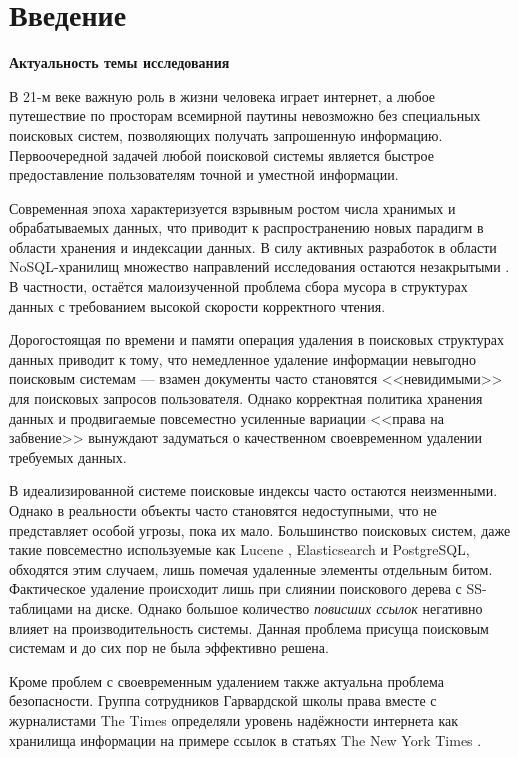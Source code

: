 \newpage
\section{Введение}

\textbf{Актуальность темы исследования}

В 21-м веке важную роль в жизни человека играет интернет, а любое путешествие
по просторам всемирной паутины невозможно без специальных поисковых систем,
позволяющих получать запрошенную информацию. Первоочередной задачей
любой поисковой системы является быстрое предоставление пользователям
точной и уместной информации.

Современная эпоха характеризуется взрывным ростом числа хранимых и обрабатываемых
данных, что приводит к распространению новых парадигм в области хранения и
индексации данных. В силу активных разработок в области NoSQL-хранилищ множество
направлений исследования остаются незакрытыми \cite{No-SQL:IoT}.
В частности, остаётся малоизученной проблема сбора мусора в структурах данных
с требованием высокой скорости корректного чтения.

Дорогостоящая по времени и памяти операция удаления в поисковых структурах данных
приводит к тому, что немедленное удаление информации невыгодно поисковым системам
 — взамен документы часто становятся <<невидимыми>> для поисковых запросов
пользователя. Однако корректная политика хранения данных \cite{Data_Retention}
и продвигаемые повсеместно усиленные вариации <<права на забвение>> вынуждают
задуматься о качественном своевременном удалении требуемых данных.

В идеализированной системе поисковые индексы часто остаются неизменными. Однако
в реальности объекты часто становятся недоступными, что не представляет особой
угрозы, пока их мало. Большинство поисковых систем, даже такие повсеместно
используемые как Lucene \cite{Lucene:2008}, Elasticsearch\cite{Elasticsearch:2020}
и PostgreSQL\cite{GIN:2020}, обходятся этим случаем, лишь помечая удаленные
элементы отдельным битом. Фактическое удаление происходит лишь при слиянии
поискового дерева с SS-таблицами на диске.
Однако большое количество \textit{повисших ссылок} негативно влияет на
производительность системы. Данная проблема присуща поисковым
системам и до сих пор не была эффективно решена.

Кроме проблем с своевременным удалением также актуальна проблема безопасности.
Группа сотрудников Гарвардской школы права вместе с журналистами The Times определяли
уровень надёжности интернета как хранилища информации на примере ссылок в статьях
The New York Times \cite{NYT}.

